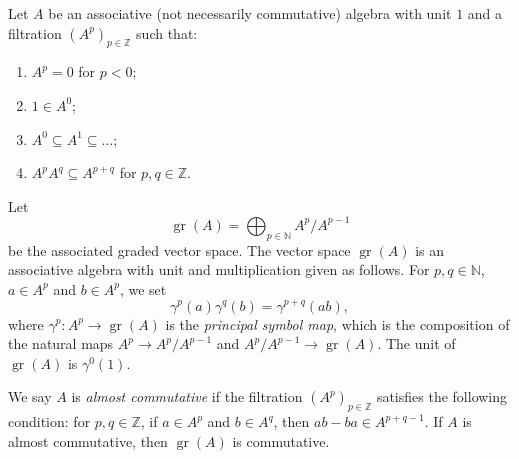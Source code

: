 \documentclass[a4paper, 12pt, reqno]{amsart}
\theoremstyle{remark}
\numberwithin{equation}{subsection}
\DeclareMathOperator{\gr}{gr}
\begin{document}
Let $A$ be an associative (not necessarily commutative) algebra with unit $1$ and a filtration $(A^p)_{p \in \mathbb{Z}}$ such that:
\begin{enumerate}
\item $A^p = 0$ for $p < 0$;
\item $1 \in A^0$;
\item $A^0 \subseteq A^1 \subseteq \dots$;
\item $A^pA^q \subseteq A^{p + q}$ for $p, q \in \mathbb{Z}$.
\end{enumerate}
Let
\begin{equation*}
  \gr(A) = \bigoplus_{p \in \mathbb{N}}A^p/A^{p - 1}
\end{equation*}
be the associated graded vector space.
The vector space $\gr(A)$ is an associative algebra with unit and multiplication given as follows.
For $p, q \in \mathbb{N}$, $a \in A^p$ and $b \in A^p$, we set
\begin{equation*}
  \gamma^p(a)\gamma^q(b) = \gamma^{p + q}(ab),
\end{equation*}
where $\gamma^p: A^p \to \gr(A)$ is the \emph{principal symbol map}, which is the composition of the natural maps $A^p \to A^p/A^{p - 1}$ and $A^p/A^{p - 1} \to \gr(A)$.
The unit of $\gr(A)$ is $\gamma^0(1)$.

We say $A$ is \emph{almost commutative} if the filtration $(A^p)_{p \in \mathbb{Z}}$ satisfies the following condition: for $p, q \in \mathbb{Z}$, if $a \in A^p$ and $b \in A^q$, then $ab - ba \in A^{p + q - 1}$.
If $A$ is almost commutative, then $\gr(A)$ is commutative.
\end{document}
